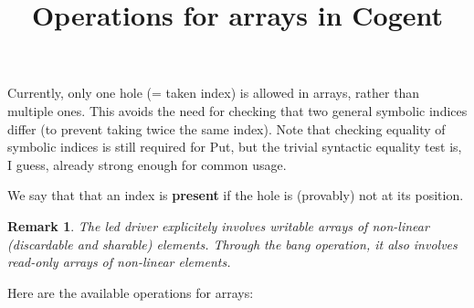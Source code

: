 \documentclass{article}
\title{Operations for arrays in Cogent}
\newtheorem{remark}[theorem]{Remark}
\begin{document}
\maketitle

Currently, only one hole (= taken index) is allowed in arrays, rather than
multiple ones. This avoids the need for checking that two general symbolic
indices differ (to prevent taking twice the same index).
Note that checking equality of symbolic indices is still required for Put, but
the trivial syntactic equality test is, I guess, already strong enough for
common usage.

We say that that an index is \textbf{present} if the hole is (provably) not at its
position.

\begin{remark}
  The led driver explicitely involves writable arrays of non-linear (discardable and sharable) elements.
  Through the bang operation, it also involves read-only arrays of non-linear
  elements.
\end{remark}

Here are the available operations for arrays:
\end{document}
